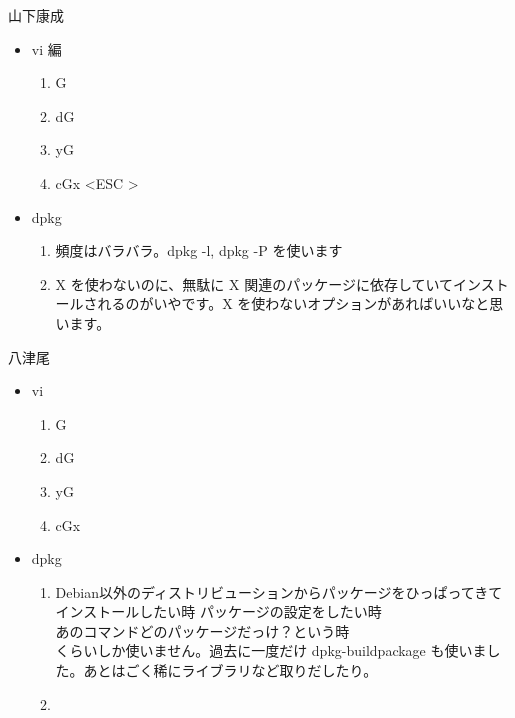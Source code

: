 \documentclass[mingoth,a4paper]{jsarticle}
\begin{document}
\begin{prework}{ 山下康成 }
  \begin{itemize}
  \item vi 編
    \begin{enumerate}
    \item G
    \item dG
    \item yG
    \item cGx \textless ESC \textgreater
    \end{enumerate}
  \item dpkg
    \begin{enumerate}
    \item 頻度はバラバラ。dpkg -l, dpkg -P を使います
    \item X を使わないのに、無駄に X 関連のパッケージに依存していてインストールされるのがいやです。X を使わないオプションがあればいいなと思います。
    \end{enumerate}
  \end{itemize}
\end{prework}

\begin{prework}{ 八津尾 }
  \begin{itemize}
  \item vi
    \begin{enumerate}
    \item G
    \item dG
    \item yG
    \item cGx
    \end{enumerate}
  \item dpkg
    \begin{enumerate}
    \item Debian以外のディストリビューションからパッケージをひっぱってきてインストールしたい時
パッケージの設定をしたい時 \\
あのコマンドどのパッケージだっけ？という時 \\
くらいしか使いません。過去に一度だけ dpkg-buildpackage も使いました。あとはごく稀にライブラリなど取りだしたり。
    \item
    \end{enumerate}
  \end{itemize}
\end{prework}
\end{document}
